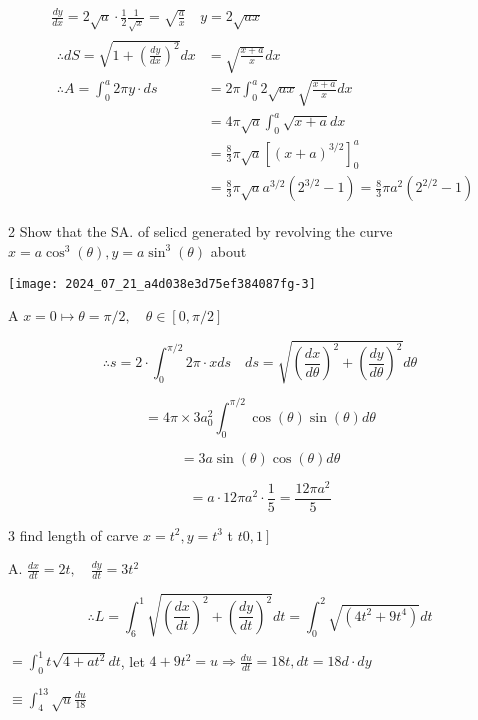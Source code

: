 \documentclass[12pt, a4paper]{article}
\begin{document}
$$
\begin{aligned}
& \frac{d y}{d x}=2 \sqrt{a} \cdot \frac{1}{2} \frac{1}{\sqrt{x}}=\sqrt{\frac{a}{x}} \quad y=2 \sqrt{a x} \\
& \begin{aligned}
\therefore d S=\sqrt{1+\left(\frac{d y}{d x}\right)^{2}} d x & =\sqrt{\frac{x+a}{x}} d x \\
\therefore A=\int_{0}^{a} 2 \pi y \cdot d s & =2 \pi \int_{0}^{a} 2 \sqrt{a x} \sqrt{\frac{x+a}{x}} d x \\
& =4 \pi \sqrt{a} \int_{0}^{a} \sqrt{x+a} d x \\
& =\frac{8}{3} \pi \sqrt{a}\left[(x+a)^{3 / 2}\right]_{0}^{a} \\
& =\frac{8}{3} \pi \sqrt{a} a^{3 / 2}\left(2^{3 / 2}-1\right)=\frac{8}{3} \pi a^{2}\left(2^{2 / 2}-1\right)
\end{aligned}
\end{aligned}
$$

2 Show that the SA. of selicd generated by revolving the curve $x=a \cos ^{3}(\theta), y=a \sin ^{3}(\theta)$ about

\begin{center}
\texttt{[image: 2024\_07\_21\_a4d038e3d75ef384087fg-3]}
\end{center}

A $x=0 \mapsto \theta=\pi / 2, \quad \theta \in[0, \pi / 2]$

$$
\therefore s=2 \cdot \int_{0}^{\pi / 2} 2 \pi \cdot x d s \quad d s=\sqrt{\left(\frac{d x}{d \theta}\right)^{2}+\left(\frac{d y}{d \theta}\right)^{2}} d \theta
$$

$$
=4 \pi \times 3 a_{0}^{2} \int_{0}^{\pi / 2} \cos (\theta) \sin (\theta) d \theta
$$

$$
=3 a \sin (\theta) \cos (\theta) d \theta
$$

$$
=a \cdot 12 \pi a^{2} \cdot \frac{1}{5}=\frac{12 \pi a^{2}}{5}
$$

3 find length of carve $x=t^{2}, y=t^{3}$ t $\left.t 0,1\right]$

A. $\frac{d x}{d t}=2 t, \quad \frac{d y}{d t}=3 t^{2}$

$$
\therefore L=\int_{6}^{1} \sqrt{\left(\frac{d x}{d t}\right)^{2}+\left(\frac{d y}{d t}\right)^{2}} d t=\int_{0}^{2} \sqrt{\left(4 t^{2}+9 t^{4}\right)} d t
$$

$=\int_{0}^{1} t \sqrt{4+a t^{2}} d t$, let $4+9 t^{2}=u \Rightarrow \frac{d u}{d t}=18 t, d t=18 d \cdot d y$

$\equiv \int_{4}^{13} \sqrt{u} \frac{d u}{18}$
\end{document}
